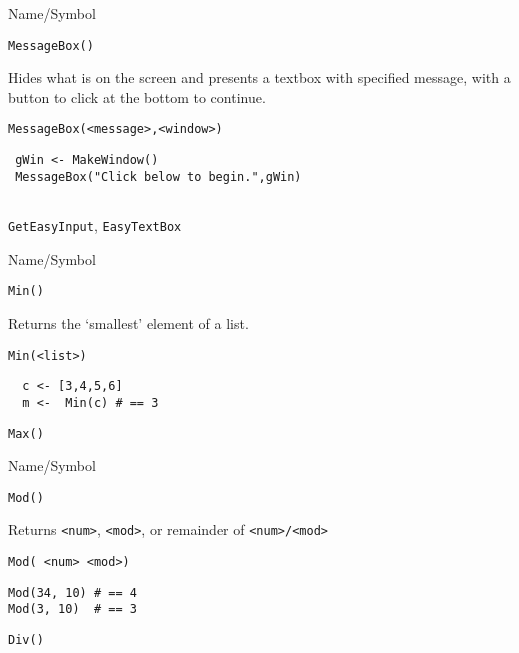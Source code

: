 \rl



\begin{desc}{Name/Symbol}
\item[Name/Symbol]	\verb+MessageBox()+

\item[Description]	Hides what is on the screen and presents a textbox with
  specified message, with a button to click at the bottom to continue.


\item[Usage]		
\begin{verbatim}
MessageBox(<message>,<window>)
\end{verbatim}

\item[Example]	
\begin{verbatim}
 gWin <- MakeWindow()
 MessageBox("Click below to begin.",gWin)


\end{verbatim}

\item[See Also]	\verb+GetEasyInput+, \verb+EasyTextBox+
\end{desc}

\rl




\begin{desc}{Name/Symbol}
\item[Name/Symbol]	\verb+Min()+

\item[Description]	Returns the `smallest' element of a list.

\item[Usage]	
\begin{verbatim}
Min(<list>)
\end{verbatim}

\item[Example]	
\begin{verbatim}
  c <- [3,4,5,6]
  m <-  Min(c) # == 3
\end{verbatim}

\item[See Also]	\verb+Max()+
\end{desc}

\rl


\begin{desc}{Name/Symbol}
\item[Name/Symbol]	\verb+Mod()+

\item[Description]	Returns \verb+<num>+, \verb+<mod>+, or remainder of \verb+<num>/<mod>+

\item[Usage]		
\begin{verbatim}
Mod( <num> <mod>)
\end{verbatim}

\item[Example]	
\begin{verbatim}
Mod(34, 10)	# == 4
Mod(3, 10)	# == 3
\end{verbatim}

\item[See Also]	\verb+Div()+
\end{desc}

